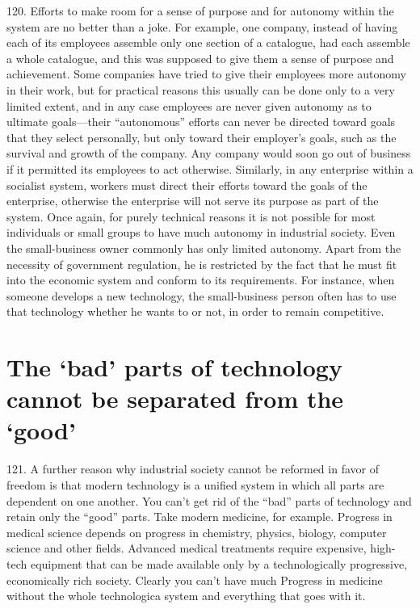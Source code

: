 \documentclass{article}
\begin{document}
120.  Efforts to make room for a sense of purpose and for autonomy within the system are no better 
than a joke.  For example, one company, instead of having each of its employees assemble only 
one section of a catalogue, had each assemble a whole catalogue, and this was supposed to give 
them a sense of purpose  and achievement.  Some companies have tried to give their  employees 
more  autonomy  in  their  work,  but  for  practical  reasons  this  usually  can  be  done  only  to  a  very  
limited extent, and in any case employees are never given autonomy as to ultimate goals—their 
“autonomous”  efforts  can  never  be  directed  toward  goals  that  they  select  personally,  but  only  
toward their employer’s  goals, such  as the survival and  growth of the  company.  Any  company  
would  soon  go  out  of  business  if  it  permitted  its  employees  to  act  otherwise.   Similarly,  in  any  
enterprise  within  a  socialist  system,  workers  must  direct  their  efforts  toward  the  goals  of  the  
enterprise, otherwise the enterprise will not serve its purpose as part of the system.  Once again, 
for purely technical reasons it is not possible for most individuals or small groups to have much 
autonomy  in  industrial  society.   Even  the  small-business  owner  commonly  has  only  limited  
autonomy.  Apart from the necessity of government regulation, he is restricted by the fact that he 
must fit into the economic system and conform to its requirements.  For instance, when someone 
develops a new technology, the small-business person often has to use that technology whether he 
wants to or not, in order to remain competitive. 


\section{The ‘bad’ parts of technology cannot be separated from the ‘good’}

\hspace{0.5cm} 121.  A further reason why industrial society cannot be reformed in favor of freedom is that modern 
technology is a unified system in which all parts are dependent on one another.  You can’t get rid 
of  the  “bad”  parts  of  technology  and  retain  only  the  “good”  parts.   Take  modern  medicine,  for  
example.   Progress  in  medical  science  depends  on  progress  in  chemistry,  physics,  biology,  
computer  science  and  other  fields.   Advanced  medical  treatments  require  expensive,  high-tech 
equipment  that  can  be  made  available  only  by  a  technologically  progressive,  economically  rich  
society.   Clearly  you  can’t  have  much  Progress  in  medicine  without  the  whole  technologica
system and everything that goes with it. \vspace{\baselineskip}
\end{document}
